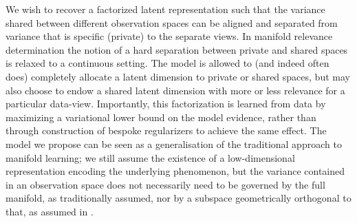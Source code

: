 We wish to recover a factorized latent representation such that the
variance shared between different observation spaces can be aligned
and separated from variance that is specific (private) to the separate
views.  In manifold relevance determination the notion of a hard
separation between private and shared spaces is relaxed to a
continuous setting. The model is allowed to (and indeed often does)
completely allocate a latent dimension to private or shared spaces,
but may also choose to endow a shared latent dimension with more or
less relevance for a particular data-view. Importantly, this
factorization is learned from data by maximizing a variational lower
bound on the model evidence, rather than through construction of
bespoke regularizers to achieve the same
effect.  
%
The model we propose can be seen as a generalisation of the traditional
approach to manifold learning; we still
assume the existence of a low-dimensional representation encoding the
underlying phenomenon, but the variance contained in an observation
space does not necessarily need to be governed by the full manifold,
as traditionally assumed, nor by a subspace geometrically orthogonal
to that, as assumed in \citet{Salzmann:2010vh}.
%




